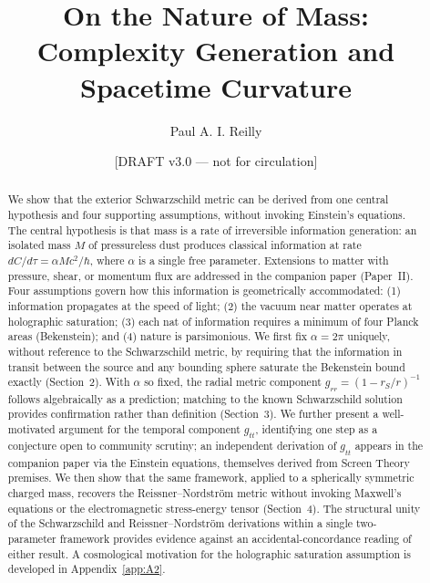 \documentclass[12pt]{article}
\title{On the Nature of Mass:\\
Complexity Generation and Spacetime Curvature}
\author{Paul A. I. Reilly}
\date{[DRAFT v3.0 --- not for circulation]}
\begin{document}
\maketitle

\begin{abstract}

We show that the exterior Schwarzschild metric can be derived from one
central hypothesis and four supporting assumptions, without invoking
Einstein's equations.
The central hypothesis is that mass is a rate of irreversible information
generation: an isolated mass $M$ of pressureless dust produces classical
information at rate $dC/d\tau = \alpha Mc^2/\hbar$, where $\alpha$ is a
single free parameter.
Extensions to matter with pressure, shear, or momentum flux are addressed
in the companion paper (Paper~II).
Four assumptions govern how this information is geometrically accommodated:
(1) information propagates at the speed of light; (2) the vacuum near
matter operates at holographic saturation; (3) each nat of information
requires a minimum of four Planck areas (Bekenstein); and (4) nature is
parsimonious.
We first fix $\alpha = 2\pi$ uniquely, without reference to the
Schwarzschild metric, by requiring that the information in transit between
the source and any bounding sphere saturate the Bekenstein bound
exactly (Section~2).
With $\alpha$ so fixed, the radial metric component
$g_{rr} = (1 - r_S/r)^{-1}$ follows algebraically as a prediction;
matching to the known Schwarzschild solution provides confirmation rather
than definition (Section~3).
We further present a well-motivated argument for the temporal component
$g_{tt}$, identifying one step as a conjecture open to community
scrutiny; an independent derivation of $g_{tt}$ appears in the companion
paper via the Einstein equations, themselves derived from Screen Theory
premises.
We then show that the same framework, applied to a spherically symmetric
charged mass, recovers the Reissner--Nordstr\"om metric without invoking
Maxwell's equations or the electromagnetic stress-energy tensor
(Section~4).
The structural unity of the Schwarzschild and Reissner--Nordstr\"om
derivations within a single two-parameter framework provides evidence
against an accidental-concordance reading of either result.
A cosmological motivation for the holographic saturation assumption
is developed in Appendix~\ref{app:A2}.

\end{abstract}
\end{document}
